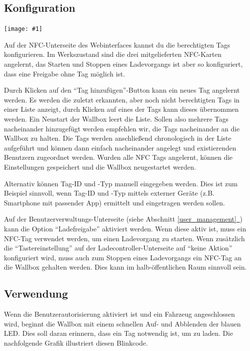 \documentclass[a4paper,10pt]{article}
\newcommand{\gfx}[1]{\texttt{[image: \#1]}}
\newcommand*{\fullref}[1]{Abschnitt \hyperref[{#1}]{\ref*{#1}~\nameref*{#1}}}
\begin{document}
\begin{multicols*}{2}
    \vspace*{-0.1cm}

    \subsection{Konfiguration}
    \gfx{./img_warp2/resized/web_nfc}

    Auf der NFC-Unterseite des Webinterfaces kannst du die berechtigten Tags konfigurieren.
    Im Werkszustand sind die drei mitgelieferten NFC-Karten angelernt,
    das Starten und Stoppen eines Ladevorgangs ist aber so konfiguriert, dass eine
    Freigabe ohne Tag möglich ist.

    Durch Klicken auf den \enquote{Tag hinzufügen}-Button kann ein neues Tag angelernt werden.
    Es werden die zuletzt erkannten, aber noch nicht berechtigten Tags in einer
    Liste anzeigt, durch Klicken auf eines der Tags kann dieses übernommen werden. Ein Neustart der
    Wallbox leert die Liste. Sollen also mehrere Tags nacheinander hinzugefügt
    werden empfehlen wir, die Tags nacheinander an die Wallbox zu halten. Die
    Tags werden anschließend chronologisch in der Liste aufgeführt und können
    dann einfach nacheinander angelegt und existierenden Benutzern zugeordnet
    werden. Wurden alle NFC Tags angelernt, können die Einstellungen gespeichert und die
    Wallbox neugestartet werden.

    Alternativ können Tag-ID und -Typ manuell eingegeben werden. Dies ist zum Beispiel sinnvoll,
    wenn Tag-ID und -Typ mittels externer Geräte (z.B. Smartphone mit passender
    App) ermittelt und eingetragen werden sollen.

    Auf der Benutzerverwaltungs-Unterseite (siehe \fullref{user_management}) kann die Option \enquote{Ladefreigabe} aktiviert werden.
    Wenn diese aktiv ist, muss ein NFC-Tag verwendet werden, um einen Ladevorgang zu starten.
    Wenn zusätzlich die \enquote{Tastereinstellung} auf der Ladecontroller-Unterseite auf \enquote{keine Aktion} konfiguriert wird,
    muss auch zum Stoppen eines Ladevorgangs ein NFC-Tag an die Wallbox gehalten werden. Dies kann im
    halb-öffentlichen Raum sinnvoll sein.

    \subsection{Verwendung}
    Wenn die Benutzerautorisierung aktiviert ist und ein Fahrzeug angeschlossen wird,
    beginnt die Wallbox mit einem schnellen Auf- und Abblenden der blauen LED.
    Dies soll daran erinnern, dass ein Tag notwendig ist, um zu laden. Die
    nachfolgende Grafik illustriert diesen Blinkcode.


\end{multicols*}
\end{document}
